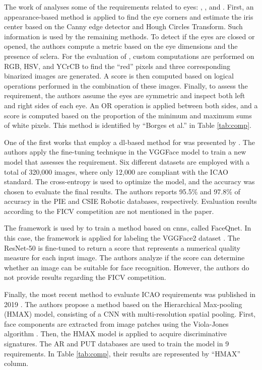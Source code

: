 The work of \citet{borges2016analysis} analyses some of the requirements related to eyes: \eyesclosed, \redeyes, and \lookingaway. First, an appearance-based method is applied to find the eye corners and estimate the iris center based on the Canny edge detector and Hough Circles Transform. Such information is used by the remaining methods. To detect if the eyes are closed or opened, the authors compute a metric based on the eye dimensions and the presence of sclera. For the evaluation of \redeyes, custom computations are performed on RGB, HSV, and YCrCB to find the ``red'' pixels and three corresponding binarized images are generated. A score is then computed based on logical operations performed in the combination of these images. Finally, to assess the \lookingaway requirement, the authors assume the eyes are symmetric and inspect both left and right sides of each eye. An OR operation is applied between both sides, and a score is computed based on the proportion of the minimum and maximum sums of white pixels. This method is identified by ``Borges et al.'' in Table \ref{tab:comp}.

One of the first works that employ a \acl{dl}-based method for \icao was presented by \cite{ahmadvand2018estimating}. The authors apply the fine-tuning technique in the VGGFace model \citep{simonyan2014very} to train a new model that assesses the \rollpitchyaw requirement. Six different datasets are employed with a total of 320,000 images, where only 12,000 are compliant with the ICAO standard. The cross-entropy is used to optimize the model, and the accuracy was chosen to evaluate the final results. The authors reports 95.5\% and 97.8\% of accuracy in the PIE \citep{sim2002cmu} and CSIE Robotic \citep{csie2006database} databases, respectively. Evaluation results according to the FICV competition are not mentioned in the paper.

The \biolabicao framework is used by \cite{hernandez2019faceqnet} to train a method based on \aclp{cnn}, called FaceQnet. In this case, the framework is applied for labeling the VGGFace2 dataset \citep{cao2018vggface2}. The ResNet-50 \citep{he2016deep} is fine-tuned to return a score that represents a numerical quality measure for each input image. The authors analyze if the score can determine whether an image can be suitable for face recognition. However, the authors do not provide results regarding the FICV competition.

Finally, the most recent method to evaluate ICAO requirements was published in 2019 \citep{nourbakhshfacial}. The authors propose a method based on the Hierarchical Max-pooling (HMAX) model, consisting of a CNN with multi-resolution spatial pooling. First, face components are extracted from image patches using the Viola-Jones algorithm \citep{viola2001rapid}. Then, the HMAX model is applied to acquire discriminative signatures. The AR \citep{martinez1998ar} and PUT \citep{kasinski2008put} databases are used to train the model in 9 requirements. In Table \ref{tab:comp}, their results are represented by ``HMAX'' column.

